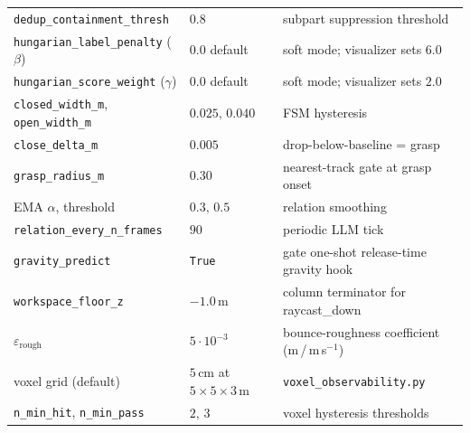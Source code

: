 \documentclass[11pt]{article}
\newcommand{\file}[1]{\texttt{#1}}
\begin{document}
\begin{tabular}{@{}lll@{}}
\texttt{dedup\_containment\_thresh} & $0.8$ & subpart suppression threshold \\
\texttt{hungarian\_label\_penalty} ($\beta$) & $0.0$ default & soft mode; visualizer sets $6.0$ \\
\texttt{hungarian\_score\_weight} ($\gamma$) & $0.0$ default & soft mode; visualizer sets $2.0$ \\
\texttt{closed\_width\_m}, \texttt{open\_width\_m} & $0.025,\,0.040$ & FSM hysteresis \\
\texttt{close\_delta\_m} & $0.005$ & drop-below-baseline = grasp \\
\texttt{grasp\_radius\_m} & $0.30$ & nearest-track gate at grasp onset \\
EMA $\alpha$, threshold & $0.3,\,0.5$ & relation smoothing \\
\texttt{relation\_every\_n\_frames} & $90$ & periodic LLM tick \\
\texttt{gravity\_predict} & \texttt{True} & gate one-shot release-time gravity hook \\
\texttt{workspace\_floor\_z} & $-1.0$\,m & column terminator for raycast\_down \\
$\varepsilon_{\text{rough}}$ & $5\!\cdot\!10^{-3}$ & bounce-roughness coefficient (m\,/\,m\,s$^{-1}$) \\
voxel grid (default) & $5\,\text{cm}$ at $5{\times}5{\times}3$\,m & \file{voxel\_observability.py} \\
\texttt{n\_min\_hit}, \texttt{n\_min\_pass} & $2,\,3$ & voxel hysteresis thresholds \\
\end{tabular}
\end{document}
